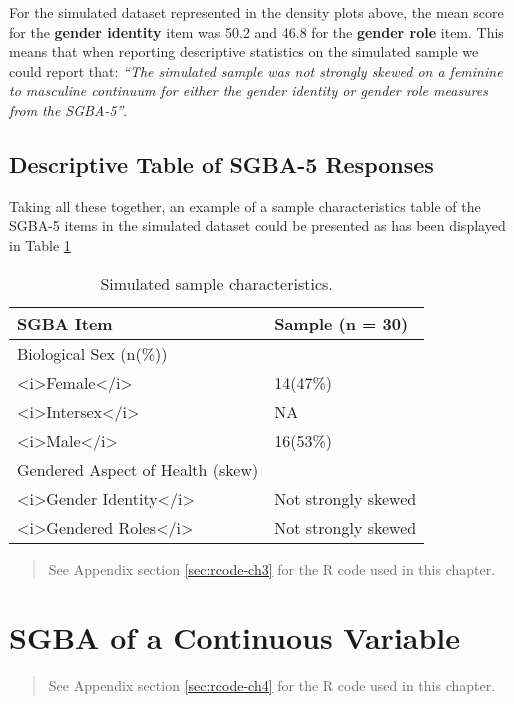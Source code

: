\documentclass[
]{book}
\begin{document}
For the simulated dataset represented in the density plots above, the mean score for the \textbf{gender identity} item was 50.2 and 46.8 for the \textbf{gender role} item. This means that when reporting descriptive statistics on the simulated sample we could report that: {\emph{``The simulated sample was not strongly skewed on a feminine to masculine continuum for either the gender identity or gender role measures from the SGBA-5''}}.

\section{Descriptive Table of SGBA-5 Responses}\label{descriptive-table-of-sgba-5-responses}

Taking all these together, an example of a sample characteristics table of the SGBA-5 items in the simulated dataset could be presented as has been displayed in Table \ref{tab:02-tab02}

\begin{table}

\caption{\label{tab:02-tab02}Simulated sample characteristics.}
\centering
\begin{tabular}[t]{ll}
\toprule
SGBA Item & Sample (n = 30)\\
\midrule
Biological Sex (n(\%)) & \\
<i>Female</i> & 14(47\%)\\
<i>Intersex</i> & NA\\
<i>Male</i> & 16(53\%)\\
Gendered Aspect of Health (skew) & \\
\addlinespace
<i>Gender Identity</i> & Not strongly skewed\\
<i>Gendered Roles</i> & Not strongly skewed\\
\bottomrule
\end{tabular}
\end{table}

\begin{quote}
See Appendix section \ref{sec:rcode-ch3} for the R code used in this chapter.
\end{quote}

\chapter{SGBA of a Continuous Variable}\label{continuous}

\begin{quote}
See Appendix section \ref{sec:rcode-ch4} for the R code used in this chapter.
\end{quote}
\end{document}
